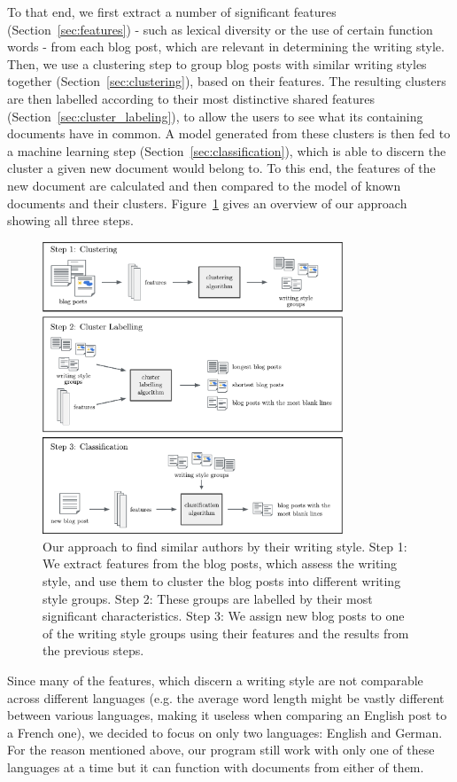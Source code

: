 To that end, we first extract a number of significant features (Section~\ref{sec:features}) - such as lexical diversity or the use of certain function words - from each blog post, which are relevant in determining the writing style.
Then, we use a clustering step to group blog posts with similar writing styles together (Section~\ref{sec:clustering}), based on their features.
The resulting clusters are then labelled according to their most distinctive shared features (Section~\ref{sec:cluster_labeling}), to allow the users to see what its containing documents have in common.
A model generated from these clusters is then fed to a machine learning step (Section~\ref{sec:classification}), which is able to discern the cluster a given new document would belong to.
To this end, the features of the new document are calculated and then compared to the model of known documents and their clusters.
Figure~\ref{fig:figure_1} gives an overview of our approach showing all three steps.

\begin{figure}[ht!]
    \centering
    \includegraphics[width=0.8\textwidth]{images/Figure_1.pdf}
    \caption{Our approach to find similar authors by their writing style. Step 1: We extract features from the blog posts, which assess the writing style, and use them to cluster the blog posts into different writing style groups. Step 2: These groups are labelled by their most significant characteristics. Step 3: We assign new blog posts to one of the writing style groups using their features and the results from the previous steps.}
    \label{fig:figure_1}
\end{figure}

Since many of the features, which discern a writing style are not comparable across different languages (e.g. the average word length might be vastly different between various languages, making it useless when comparing an English post to a French one), we decided to focus on only two languages: English and German.
For the reason mentioned above, our program still work with only one of these languages at a time but it can function with documents from either of them.

